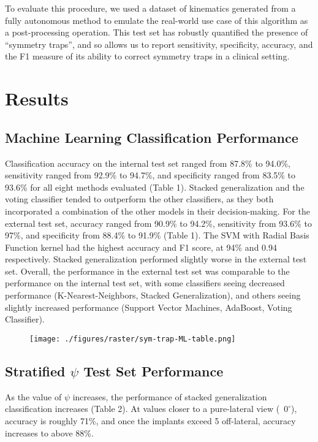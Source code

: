 To evaluate this procedure, we used a dataset of kinematics generated from a fully autonomous method \cite{jensenJointTrackMachine2023} to emulate the real-world use case of this algorithm as a post-processing operation.
This test set has robustly quantified the presence of “symmetry traps”, and so allows us to report sensitivity, specificity, accuracy, and the F1 measure of its ability to correct symmetry traps in a clinical setting.


\section{Results}
\subsection{Machine Learning Classification Performance}
Classification accuracy on the internal test set ranged from 87.8\% to 94.0\%, sensitivity ranged from 92.9\% to 94.7\%, and specificity ranged from 83.5\% to 93.6\% for all eight methods evaluated (Table 1).
Stacked generalization and the voting classifier tended to outperform the other classifiers, as they both incorporated a combination of the other models in their decision-making.
For the external test set, accuracy ranged from 90.9\% to 94.2\%, sensitivity from 93.6\% to 97\%, and specificity from 88.4\% to 91.9\%  (Table 1).
The SVM with Radial Basis Function kernel had the highest accuracy and F1 score, at 94\% and 0.94 respectively. Stacked generalization performed slightly worse in the external test set.
Overall, the performance in the external test set was comparable to the performance on the internal test set, with some classifiers seeing decreased performance (K-Nearest-Neighbors, Stacked Generalization), and others seeing slightly increased performance (Support Vector Machines, AdaBoost, Voting Classifier).

\begin{figure}
  \centering
  \texttt{[image: ./figures/raster/sym-trap-ML-table.png]}
\end{figure}

\subsection{Stratified $\psi$ Test Set Performance}
As the value of $\psi$ increases, the performance of stacked generalization classification increases (Table 2).
At values closer to a pure-lateral view (~$0^{\circ}$), accuracy is roughly 71\%, and once the implants exceed 5 off-lateral, accuracy increases to above 88\%.

